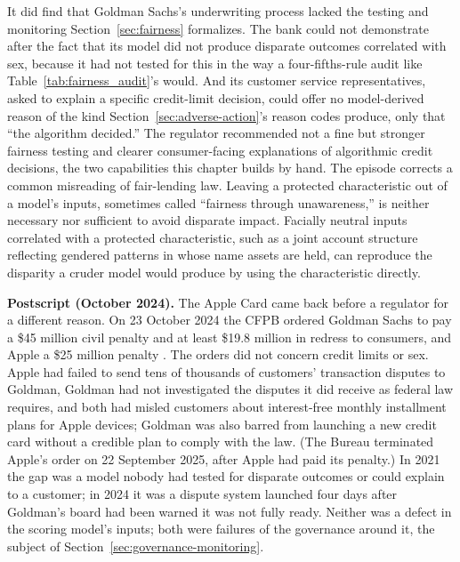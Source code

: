 \documentclass[../ai_in_finance]{subfiles}
\begin{document}
It did find that Goldman Sachs's underwriting process lacked the testing and monitoring Section~\ref{sec:fairness} formalizes. The bank could not demonstrate after the fact that its model did not produce disparate outcomes correlated with sex, because it had not tested for this in the way a four-fifths-rule audit like Table~\ref{tab:fairness_audit}'s would. And its customer service representatives, asked to explain a specific credit-limit decision, could offer no model-derived reason of the kind Section~\ref{sec:adverse-action}'s reason codes produce, only that ``the algorithm decided.'' The regulator recommended not a fine but stronger fairness testing and clearer consumer-facing explanations of algorithmic credit decisions, the two capabilities this chapter builds by hand. The episode corrects a common misreading of fair-lending law. Leaving a protected characteristic out of a model's inputs, sometimes called ``fairness through unawareness,'' is neither necessary nor sufficient to avoid disparate impact. Facially neutral inputs correlated with a protected characteristic, such as a joint account structure reflecting gendered patterns in whose name assets are held, can reproduce the disparity a cruder model would produce by using the characteristic directly.

\textbf{Postscript (October 2024).} The Apple Card came back before a regulator for a different reason. On 23 October 2024 the CFPB ordered Goldman Sachs to pay a \$45 million civil penalty and at least \$19.8 million in redress to consumers, and Apple a \$25 million penalty \parencite{cfpb2024apple}. The orders did not concern credit limits or sex. Apple had failed to send tens of thousands of customers' transaction disputes to Goldman, Goldman had not investigated the disputes it did receive as federal law requires, and both had misled customers about interest-free monthly installment plans for Apple devices; Goldman was also barred from launching a new credit card without a credible plan to comply with the law. (The Bureau terminated Apple's order on 22 September 2025, after Apple had paid its penalty.) In 2021 the gap was a model nobody had tested for disparate outcomes or could explain to a customer; in 2024 it was a dispute system launched four days after Goldman's board had been warned it was not fully ready. Neither was a defect in the scoring model's inputs; both were failures of the governance around it, the subject of Section~\ref{sec:governance-monitoring}.
\end{document}
